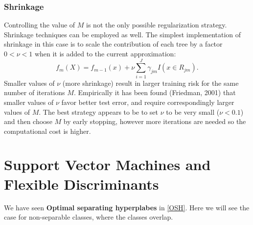 \documentclass[12pt, letterpaper]{article}
\theoremstyle{definition}
\begin{document}
\subsubsection{Shrinkage}
Controlling the value of $M$ is not the only possible regularization strategy. Shrinkage techniques can be employed as well. The simplest implementation of shrinkage in this case is to scale the contribution of each tree by a factor $0<\nu<1$ when it is added to the current approximation:
\begin{equation}
f_m(X) = f_{m-1}(x) + \nu \sum_{i=1}^J \gamma_{jm}I(x \in R_{jm}).
\end{equation}
Smaller values of $\nu$ (more shrinkage) result in larger training risk for the same number of iterations $M$. Empirically it has been found (Friedman, 2001) that smaller values of $\nu$ favor better test error, and require correspondingly larger values of $M$. The best strategy appears to be to set $\nu$ to be very small ($\nu < 0.1$) and then choose $M$ by early stopping, however more iterations are needed so the computational cost is higher. 

\newpage
\section{Support Vector Machines and Flexible Discriminants}
We have seen \textbf{Optimal separating hyperplabes} in \ref{OSH}. Here we will see the case for non-separable classes, where the classes overlap.
\end{document}

